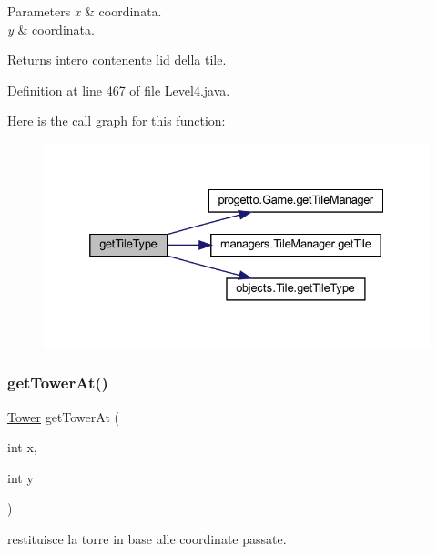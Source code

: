 \begin{DoxyParams}{Parameters}
{\em x} & coordinata. \\
\hline
{\em y} & coordinata.\\
\hline
\end{DoxyParams}
\begin{DoxyReturn}{Returns}
intero contenente l\textquotesingle{}id della tile. 
\end{DoxyReturn}


Definition at line 467 of file Level4.\+java.

Here is the call graph for this function\+:\nopagebreak
\begin{figure}[H]
\begin{center}
\leavevmode
\includegraphics[width=332pt]{classscenes_1_1_level4_ac689e72523c8460ac3160526d310b1b7_cgraph}
\end{center}
\end{figure}
\mbox{\label{classscenes_1_1_level4_a4345f2e80059788e5ab1dd1cf0ff2c04}} 
\subsubsection{\texorpdfstring{get\+Tower\+At()}{getTowerAt()}}
{\footnotesize\ttfamily \hyperlink{classtowers_1_1_tower}{Tower} get\+Tower\+At (\begin{DoxyParamCaption}\item[{int}]{x,  }\item[{int}]{y }\end{DoxyParamCaption})\hspace{0.3cm}{\ttfamily [private]}}



restituisce la torre in base alle coordinate passate. 


